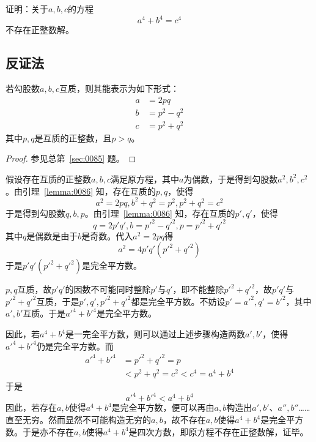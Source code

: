

证明：关于$a, b, c$的方程
\[ a^4 + b^4 = c^4 \]
不存在正整数解。

\subsection{反证法}

\begin{lemma} \label{lemma:0086}
  若勾股数$a, b, c$互质，则其能表示为如下形式：
  \begin{align*}
    a &= 2pq \\
    b &= p^2 - q^2 \\
    c &= p^2 + q^2
  \end{align*}
  其中$p, q$是互质的正整数，且$p > q$。
\end{lemma}

\begin{proof}
  参见总第~\ref{sec:0085} 题。
\end{proof}

假设存在互质的正整数$a, b, c$满足原方程，其中$a$为偶数，于是得到勾股数$a^2, b^2, c^2$。由引理~\ref{lemma:0086} 知，存在互质的$p, q$，使得
\[ a^2 = 2pq, b^2 + q^2 = p^2, p^2 + q^2 = c^2 \]
于是得到勾股数$q, b, p$。由引理~\ref{lemma:0086} 知，存在互质的$p', q'$，使得
\[ q = 2p'q', b = p'^2 - q'^2, p = p'^2 + q'^2 \]
其中$q$是偶数是由于$b$是奇数。代入$a^2 = 2pq$得
\[ a^2 = 4p'q'\left(p'^2 + q'^2\right) \]
于是$p'q'\left(p'^2 + q'^2\right)$是完全平方数。

$p, q$互质，故$p'q'$的因数不可能同时整除$p'$与$q'$，即不能整除$p'^2 + q'^2$，故$p'q'$与$p'^2 + q'^2$互质，于是$p', q', p'^2 + q'^2$都是完全平方数。不妨设$p' = a'^2, q' = b'^2$，其中$a', b'$互质。于是$a'^4 + b'^4$是完全平方数。

因此，若$a^4 + b^4$是一完全平方数，则可以通过上述步骤构造两数$a', b'$，使得$a'^4 + b'^4$仍是完全平方数。而
\begin{align*}
  a'^4 + b'^4 &= p'^2 + q'^2 = p \\
  &< p^2 + q^2 = c^2 < c^4 = a^4 + b^4
\end{align*}
于是
\[ a'^4 + b'^4 < a^4 + b^4 \]
因此，若存在$a, b$使得$a^4 + b^4$是完全平方数，便可以再由$a, b$构造出$a', b'$、$a'', b''$……直至无穷。然而显然不可能构造无穷的$a, b$，故不存在$a, b$使得$a^4 + b^4$是完全平方数。于是亦不存在$a, b$使得$a^4 + b^4$是四次方数，即原方程不存在正整数解，证毕。
